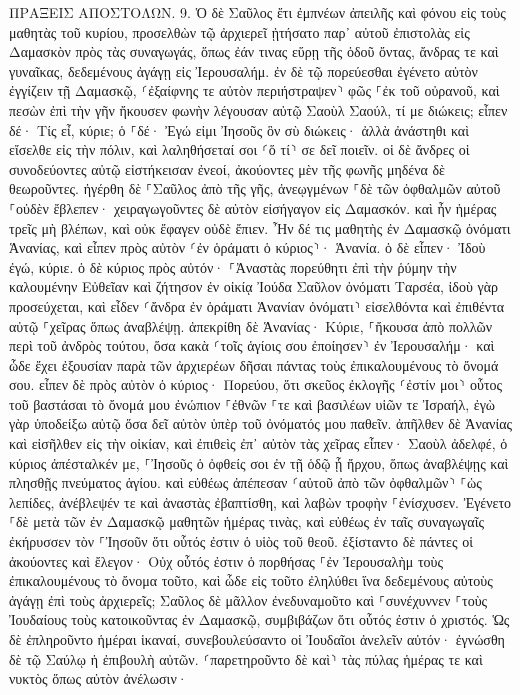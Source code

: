 \documentclass[twoside, 9pt]{extreport}
\begin{document}
ΠΡΑΞΕΙΣ ΑΠΟΣΤΟΛΩΝ.
9.
Ὁ δὲ Σαῦλος ἔτι ἐμπνέων ἀπειλῆς καὶ φόνου εἰς τοὺς μαθητὰς τοῦ κυρίου, προσελθὼν τῷ ἀρχιερεῖ 
ᾐτήσατο παρ᾽ αὐτοῦ ἐπιστολὰς εἰς Δαμασκὸν πρὸς τὰς συναγωγάς, ὅπως ἐάν τινας εὕρῃ τῆς ὁδοῦ ὄντας, ἄνδρας τε καὶ γυναῖκας, δεδεμένους ἀγάγῃ εἰς Ἰερουσαλήμ. 
ἐν δὲ τῷ πορεύεσθαι ἐγένετο αὐτὸν ἐγγίζειν τῇ Δαμασκῷ, ⸂ἐξαίφνης τε αὐτὸν περιήστραψεν⸃ φῶς ⸀ἐκ τοῦ οὐρανοῦ, 
καὶ πεσὼν ἐπὶ τὴν γῆν ἤκουσεν φωνὴν λέγουσαν αὐτῷ Σαοὺλ Σαούλ, τί με διώκεις; 
εἶπεν δέ· Τίς εἶ, κύριε; ὁ ⸀δέ· Ἐγώ εἰμι Ἰησοῦς ὃν σὺ διώκεις· 
ἀλλὰ ἀνάστηθι καὶ εἴσελθε εἰς τὴν πόλιν, καὶ λαληθήσεταί σοι ⸂ὅ τί⸃ σε δεῖ ποιεῖν. 
οἱ δὲ ἄνδρες οἱ συνοδεύοντες αὐτῷ εἱστήκεισαν ἐνεοί, ἀκούοντες μὲν τῆς φωνῆς μηδένα δὲ θεωροῦντες. 
ἠγέρθη δὲ ⸀Σαῦλος ἀπὸ τῆς γῆς, ἀνεῳγμένων ⸀δὲ τῶν ὀφθαλμῶν αὐτοῦ ⸀οὐδὲν ἔβλεπεν· χειραγωγοῦντες δὲ αὐτὸν εἰσήγαγον εἰς Δαμασκόν. 
καὶ ἦν ἡμέρας τρεῖς μὴ βλέπων, καὶ οὐκ ἔφαγεν οὐδὲ ἔπιεν. 
Ἦν δέ τις μαθητὴς ἐν Δαμασκῷ ὀνόματι Ἁνανίας, καὶ εἶπεν πρὸς αὐτὸν ⸂ἐν ὁράματι ὁ κύριος⸃· Ἁνανία. ὁ δὲ εἶπεν· Ἰδοὺ ἐγώ, κύριε. 
ὁ δὲ κύριος πρὸς αὐτόν· ⸀Ἀναστὰς πορεύθητι ἐπὶ τὴν ῥύμην τὴν καλουμένην Εὐθεῖαν καὶ ζήτησον ἐν οἰκίᾳ Ἰούδα Σαῦλον ὀνόματι Ταρσέα, ἰδοὺ γὰρ προσεύχεται, 
καὶ εἶδεν ⸂ἄνδρα ἐν ὁράματι Ἁνανίαν ὀνόματι⸃ εἰσελθόντα καὶ ἐπιθέντα αὐτῷ ⸀χεῖρας ὅπως ἀναβλέψῃ. 
ἀπεκρίθη δὲ Ἁνανίας· Κύριε, ⸀ἤκουσα ἀπὸ πολλῶν περὶ τοῦ ἀνδρὸς τούτου, ὅσα κακὰ ⸂τοῖς ἁγίοις σου ἐποίησεν⸃ ἐν Ἰερουσαλήμ· 
καὶ ὧδε ἔχει ἐξουσίαν παρὰ τῶν ἀρχιερέων δῆσαι πάντας τοὺς ἐπικαλουμένους τὸ ὄνομά σου. 
εἶπεν δὲ πρὸς αὐτὸν ὁ κύριος· Πορεύου, ὅτι σκεῦος ἐκλογῆς ⸂ἐστίν μοι⸃ οὗτος τοῦ βαστάσαι τὸ ὄνομά μου ἐνώπιον ⸀ἐθνῶν ⸀τε καὶ βασιλέων υἱῶν τε Ἰσραήλ, 
ἐγὼ γὰρ ὑποδείξω αὐτῷ ὅσα δεῖ αὐτὸν ὑπὲρ τοῦ ὀνόματός μου παθεῖν. 
ἀπῆλθεν δὲ Ἁνανίας καὶ εἰσῆλθεν εἰς τὴν οἰκίαν, καὶ ἐπιθεὶς ἐπ᾽ αὐτὸν τὰς χεῖρας εἶπεν· Σαοὺλ ἀδελφέ, ὁ κύριος ἀπέσταλκέν με, ⸀Ἰησοῦς ὁ ὀφθείς σοι ἐν τῇ ὁδῷ ᾗ ἤρχου, ὅπως ἀναβλέψῃς καὶ πλησθῇς πνεύματος ἁγίου. 
καὶ εὐθέως ἀπέπεσαν ⸂αὐτοῦ ἀπὸ τῶν ὀφθαλμῶν⸃ ⸀ὡς λεπίδες, ἀνέβλεψέν τε καὶ ἀναστὰς ἐβαπτίσθη, 
καὶ λαβὼν τροφὴν ⸀ἐνίσχυσεν. Ἐγένετο ⸀δὲ μετὰ τῶν ἐν Δαμασκῷ μαθητῶν ἡμέρας τινὰς, 
καὶ εὐθέως ἐν ταῖς συναγωγαῖς ἐκήρυσσεν τὸν ⸀Ἰησοῦν ὅτι οὗτός ἐστιν ὁ υἱὸς τοῦ θεοῦ. 
ἐξίσταντο δὲ πάντες οἱ ἀκούοντες καὶ ἔλεγον· Οὐχ οὗτός ἐστιν ὁ πορθήσας ⸀ἐν Ἰερουσαλὴμ τοὺς ἐπικαλουμένους τὸ ὄνομα τοῦτο, καὶ ὧδε εἰς τοῦτο ἐληλύθει ἵνα δεδεμένους αὐτοὺς ἀγάγῃ ἐπὶ τοὺς ἀρχιερεῖς; 
Σαῦλος δὲ μᾶλλον ἐνεδυναμοῦτο καὶ ⸀συνέχυννεν ⸀τοὺς Ἰουδαίους τοὺς κατοικοῦντας ἐν Δαμασκῷ, συμβιβάζων ὅτι οὗτός ἐστιν ὁ χριστός. 
Ὡς δὲ ἐπληροῦντο ἡμέραι ἱκαναί, συνεβουλεύσαντο οἱ Ἰουδαῖοι ἀνελεῖν αὐτόν· 
ἐγνώσθη δὲ τῷ Σαύλῳ ἡ ἐπιβουλὴ αὐτῶν. ⸂παρετηροῦντο δὲ καὶ⸃ τὰς πύλας ἡμέρας τε καὶ νυκτὸς ὅπως αὐτὸν ἀνέλωσιν· 
\end{document}
